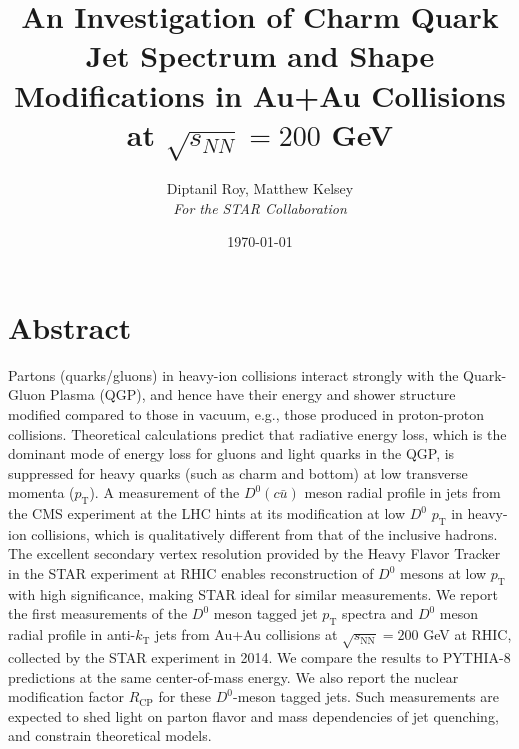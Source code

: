 \documentclass[letterpaper,12pt]{article}
\begin{document}
\providecommand{\keywords}[1]
{
  \small	
  \textbf{\textit{Keywords:}} #1
}

\title{An Investigation of Charm Quark Jet Spectrum and Shape Modifications in Au+Au Collisions at $\sqrt{s_{NN}} = 200$ GeV}
\author{Diptanil Roy, Matthew Kelsey \\ \textit{For the STAR Collaboration}}
\date{\today}
\maketitle

\section{Abstract}

\begin{linenumbers}
Partons (quarks/gluons) in heavy-ion collisions interact strongly with the Quark-Gluon Plasma (QGP), and hence have their energy and shower structure modified compared to those in vacuum, e.g., those produced in proton-proton collisions. Theoretical calculations predict that radiative energy loss, which is the dominant mode of energy loss for gluons and light quarks in the QGP, is suppressed for heavy quarks (such as charm and bottom) at low transverse momenta ($p_{\text{T}}$). A measurement of the $D^0 (c\bar{u})$ meson radial profile in jets from the CMS experiment at the LHC hints at its modification at low $D^0$ $p_{\text{T}}$ in heavy-ion collisions, which is qualitatively different from that of the inclusive hadrons. The excellent secondary vertex resolution provided by the Heavy Flavor Tracker in the STAR experiment at RHIC enables reconstruction of $D^0$ mesons at low $p_{\text{T}}$ with high significance, making STAR ideal for similar measurements.
\newline
We report the first measurements of the $D^0$ meson tagged jet $p_{\text{T}}$ spectra and $D^0$ meson radial profile in anti-$k_\text{T}$ jets from Au+Au collisions at $\sqrt{s_{\text{NN}}} = 200$ GeV at RHIC, collected by the STAR experiment in 2014. We compare the results to PYTHIA-8 predictions at the same center-of-mass energy. We also report the nuclear modification factor $R_{\text{CP}}$ for these $D^{0}$-meson tagged jets. Such measurements are expected to shed light on parton flavor and mass dependencies of jet quenching, and constrain theoretical models.

\end{linenumbers}

\hspace{10pt}
\end{document}
